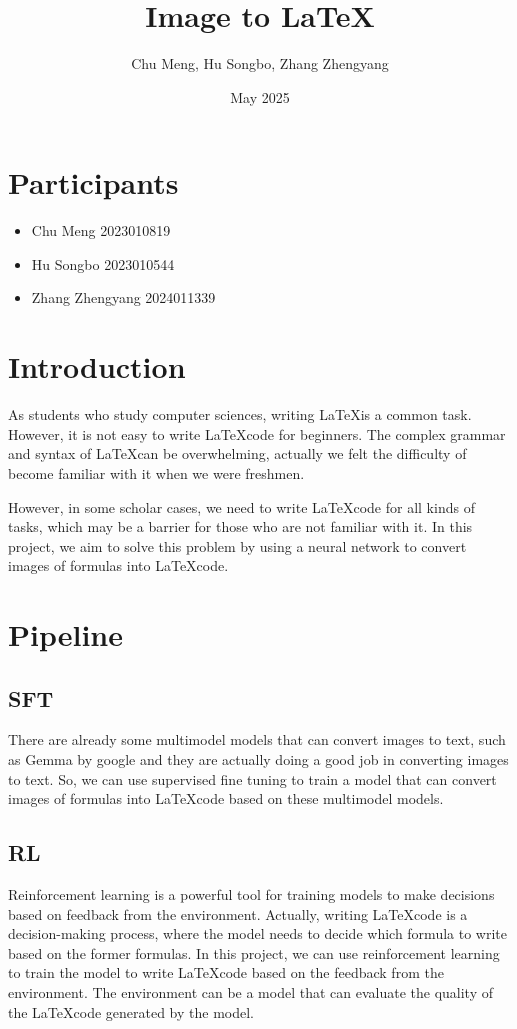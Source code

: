 \documentclass[11pt]{article}
\title{Image to \LaTeX}
\author{Chu Meng, Hu Songbo, Zhang Zhengyang}
\date{May 2025}
\begin{document}
\maketitle
\section{Participants}
\begin{itemize}
    \item Chu Meng 2023010819
    \item Hu Songbo 2023010544
    \item Zhang Zhengyang 2024011339
\end{itemize}
\section{Introduction}
As students who study computer sciences, writing \LaTeX is a common task. However, it is not easy to write \LaTeX code for beginners. The complex grammar and syntax of \LaTeX can be overwhelming, actually we felt the difficulty of become familiar with it when we were freshmen. 

However, in some scholar cases, we need to write \LaTeX code for all kinds of tasks, which may be a barrier for those who are not familiar with it. In this project, we aim to solve this problem by using a neural network to convert images of formulas into \LaTeX code.
\section{Pipeline}    
\subsection{SFT}
There are already some multimodel models that can convert images to text, such as Gemma by google and they are actually doing a good job in converting images to text. So, we can use supervised fine tuning to train a model that can convert images of formulas into \LaTeX code based on these multimodel models. 
\subsection{RL}
Reinforcement learning is a powerful tool for training models to make decisions based on feedback from the environment. Actually, writing \LaTeX code is a decision-making process, where the model needs to decide which formula to write based on the former formulas. In this project, we can use reinforcement learning to train the model to write \LaTeX code based on the feedback from the environment. The environment can be a model that can evaluate the quality of the \LaTeX code generated by the model. 
\end{document}
